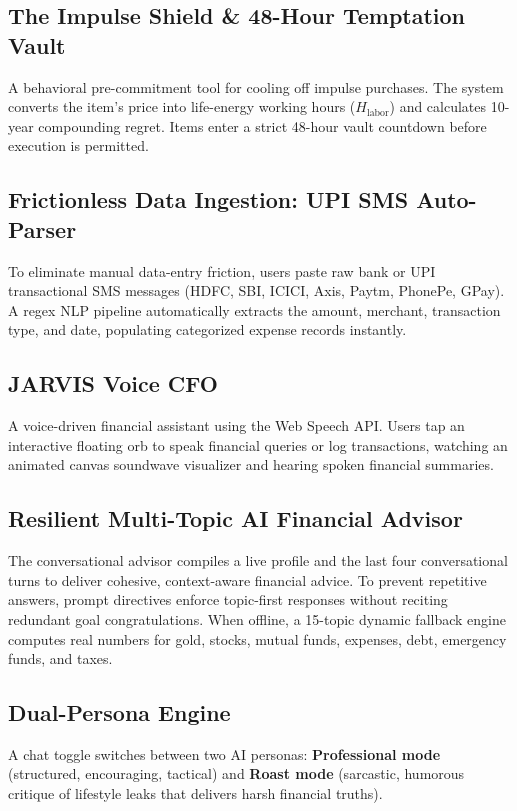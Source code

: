 \documentclass[12pt,a4paper]{report}
\begin{document}
\subsection{The Impulse Shield \& 48-Hour Temptation Vault}\label{s4312}
A behavioral pre-commitment tool for cooling off impulse purchases. The system converts the item's price into life-energy working hours ($H_{\text{labor}}$) and calculates 10-year compounding regret. Items enter a strict 48-hour vault countdown before execution is permitted.

\subsection{Frictionless Data Ingestion: UPI SMS Auto-Parser}\label{s4313}
To eliminate manual data-entry friction, users paste raw bank or UPI transactional SMS messages (HDFC, SBI, ICICI, Axis, Paytm, PhonePe, GPay). A regex NLP pipeline automatically extracts the amount, merchant, transaction type, and date, populating categorized expense records instantly.

\subsection{JARVIS Voice CFO}\label{s4314}
A voice-driven financial assistant using the Web Speech API. Users tap an interactive floating orb to speak financial queries or log transactions, watching an animated canvas soundwave visualizer and hearing spoken financial summaries.

\subsection{Resilient Multi-Topic AI Financial Advisor}\label{s4315}
The conversational advisor compiles a live profile and the last four conversational turns to deliver cohesive, context-aware financial advice. To prevent repetitive answers, prompt directives enforce topic-first responses without reciting redundant goal congratulations. When offline, a 15-topic dynamic fallback engine computes real numbers for gold, stocks, mutual funds, expenses, debt, emergency funds, and taxes.

\subsection{Dual-Persona Engine}\label{s4316}
A chat toggle switches between two AI personas: \textbf{Professional mode} (structured, encouraging, tactical) and \textbf{Roast mode} (sarcastic, humorous critique of lifestyle leaks that delivers harsh financial truths).
\end{document}
